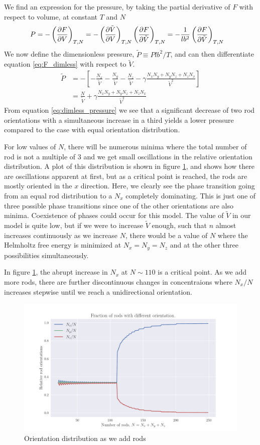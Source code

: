 \documentclass[reprint,english,notitlepage,aps,nobalancelastpage,nofootinbib]{revtex4-1}
\newcommand{\closed}[1]{\left(#1\right)}
\newcommand{\bracket}[1]{\left[#1\right]}
\newcommand{\tmdv}[4]{\closed{\pdv{#1}{#2}}_{#3,#4}}
\newcommand{\nx}{N_x}
\newcommand{\ny}{N_y}
\newcommand{\nz}{N_z}
\newcommand{\V}{\tilde{V}}
\renewcommand{\P}{\tilde{P}}
\begin{document}
We find an expression for the pressure, by taking the partial derivative of $F$ with respect to volume, at constant $T$ and $N$
\begin{align*}
	P &= -\tmdv{F}{V}{T}{N} = -\tmdv{\V}{V}{T}{N}\tmdv{F}{\V}{T}{N}=-\frac{1}{lb^2}\tmdv{F}{\V}{T}{N}
\end{align*}
We now define the dimensionless pressure, $\P\equiv Plb^2/T$, and can then differentiate equation \eqref{eq:F_dimless} with respect to $\V$.
\begin{align}
	\P &= -\bracket{-\frac{\nx}{\V} -\frac{\ny}{\V} -\frac{\nz}{\V} - \gamma \frac{\nx\ny+\ny\nz+\nz\nx}{\V^2}} \nonumber \\ 
	& = \frac{N}{\V} + \gamma \frac{\nx\ny+\ny\nz+\nz\nx}{\V^2} \label{eq:dimless_pressure}
\end{align}
From equation \eqref{eq:dimless_pressure} we see that a significant decrease of two rod orientations with a simultaneous increase in a third yields a lower pressure compared to the case with equal orientation distribution.  

For low values of $N$, there will be numerous minima where the total number of rod is not a multiple of $3$ and we get small oscillations in the relative orientation distribution. A plot of this distribution is shown in figure \ref{fig:F_N}, and shows how there are oscillations apparent at first, but as a critical point is reached, the rods are mostly oriented in the $x$ direction. Here, we clearly see the phase transition going from an equal rod distribution to a $\nx$ completely dominating. This is just one of three possible phase transitions since one of the other orientations are also minima. Coexistence of phases could occur for this model. The value of $\V$ in our model is quite low, but if we were to increase $\V$ enough, such that $n$ almost increases continuously as we increase $N$, there would be a value of $N$ where the Helmholtz free energy is minimized at $\nx=\ny=\nz$ and at the other three possibilities simultaneously. 

In figure \ref{fig:F_N}, the abrupt increase in $\nx$ at $N\sim110$ is a critical point. As we add more rods, there are further discontinuous changes in concentraions where $\nx/N$ increases stepwise until we reach a unidirectional orientation. 

\begin{figure}[h!]
	\centering
	\includegraphics[width=0.8\linewidth]{helmholtz_number_density.pdf}
	\caption{Orientation distribution as we add rods}
	\label{fig:F_N}
\end{figure}
\end{document}
